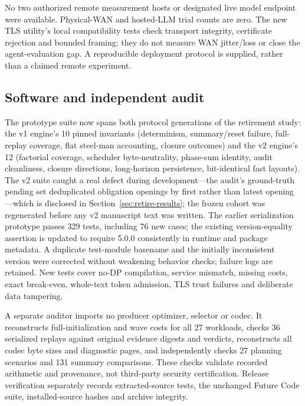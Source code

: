 No two authorized remote measurement hosts or designated live model endpoint were
available. Physical-WAN and hosted-LLM trial counts are zero. The new TLS
utility's local compatibility tests check transport integrity, certificate
rejection and bounded framing; they do not measure WAN jitter/loss or close the
agent-evaluation gap. A reproducible deployment protocol is supplied, rather than
a claimed remote experiment.

\subsection{Software and independent audit}\label{sec:audit}
The prototype suite now spans both protocol generations of the
retirement study: the v1 engine's 10 pinned invariants
(determinism, summary/reset failure, full-replay coverage, flat
steel-man accounting, closure outcomes) and the v2 engine's 12
(factorial coverage, scheduler byte-neutrality, phase-sum identity,
audit cleanliness, closure directions, long-horizon persistence,
bit-identical fast layouts). The v2 suite caught a real defect during
development---the audit's ground-truth pending set deduplicated
obligation openings by first rather than latest opening---which is
disclosed in Section~\ref{sec:retire-results}; the frozen cohort was
regenerated before any v2 manuscript text was written. The earlier
serialization prototype passes 329 tests, including 76 new cases; the existing
version-equality assertion is updated to require 5.0.0 consistently in runtime and
package metadata. A duplicate test-module basename and the initially inconsistent
version were corrected without weakening behavior checks; failure logs are
retained. New tests cover no-DP compilation, service mismatch, missing costs,
exact break-even, whole-text token admission, TLS trust failures and deliberate
data tampering.

A separate auditor imports no producer optimizer, selector or codec. It
reconstructs full-initialization and wave costs for all 27 workloads, checks 36
serialized replays against original evidence digests and verdicts, reconstructs
all codec byte sizes and diagnostic pages, and independently checks 27 planning
scenarios and 131 summary comparisons. These checks validate recorded arithmetic
and provenance, not third-party security certification. Release verification
separately records extracted-source tests, the unchanged Future Code suite,
installed-source hashes and archive integrity.
